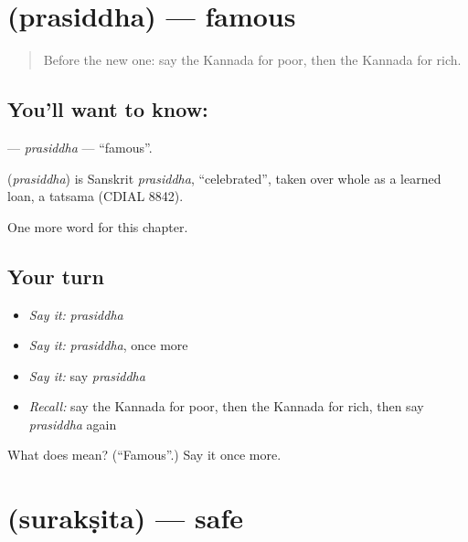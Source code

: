 \section[\texorpdfstring{\kn{ಪ್ರಸಿದ್ಧ} (prasiddha)}{ಪ್ರಸಿದ್ಧ (prasiddha)}]{ (prasiddha) — famous}

\label{lesson:KA-C143-prasiddha}



\begin{quote}
Before the new one: say the Kannada for poor, then the Kannada for rich.
\end{quote}

\subsection*{You'll want to know: }
\textbf{} — \emph{prasiddha} — \textquotedblleft{}famous\textquotedblright{}.

\begin{cousinweb}
\textbf{} (\emph{prasiddha}) is Sanskrit \emph{prasiddha}, \textquotedblleft{}celebrated\textquotedblright{}, taken over whole as a learned loan, a tatsama (CDIAL 8842).
\end{cousinweb}

\begin{grammarlens}[title={What you've built}]
One more word for this chapter.
\end{grammarlens}

\subsection*{Your turn}
\begin{itemize}
\raggedright
  \item \emph{Say it:} \emph{prasiddha}
  \item \emph{Say it:} \emph{prasiddha}, once more
  \item \emph{Say it:} say \emph{prasiddha}
  \item \emph{Recall:} say the Kannada for poor, then the Kannada for rich, then say \emph{prasiddha} again
\end{itemize}

\begin{tcolorbox}[breakable,colback=teal!4,colframe=teal!35!black,title={Before you move on}]
What does  mean? (\textquotedblleft{}Famous\textquotedblright{}.) Say it once more.
\end{tcolorbox}
\section[\texorpdfstring{\kn{ಸುರಕ್ಷಿತ} (surakṣita)}{ಸುರಕ್ಷಿತ (surakṣita)}]{ (surakṣita) — safe}

